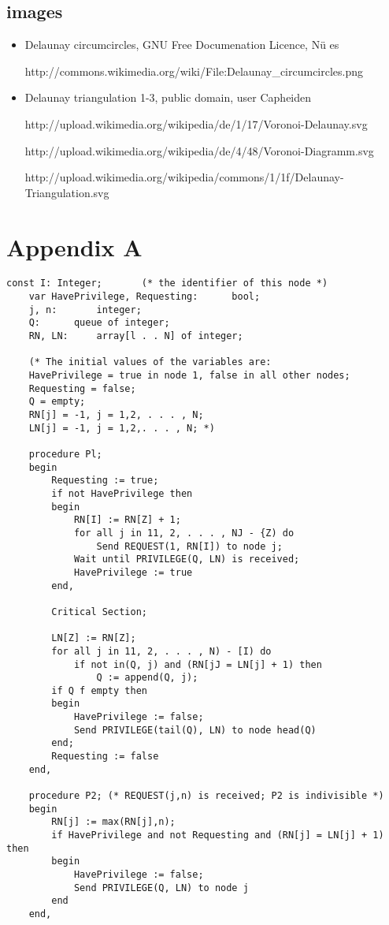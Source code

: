 \documentclass[a4paper,12pt]{article}
\begin{document}
\subsection{images}
\begin{itemize}
\item
Delaunay circumcircles, GNU Free Documenation Licence, N\"u es

http://commons.wikimedia.org/wiki/File:Delaunay\_circumcircles.png

\item
Delaunay triangulation 1-3, public domain, user Capheiden 

http://upload.wikimedia.org/wikipedia/de/1/17/Voronoi-Delaunay.svg

http://upload.wikimedia.org/wikipedia/de/4/48/Voronoi-Diagramm.svg

http://upload.wikimedia.org/wikipedia/commons/1/1f/Delaunay-Triangulation.svg
\end{itemize}

\newpage
\section{Appendix A}
\begin{lstlisting}[label=some-code,caption=Suzuki and Kazami's algorithm]
const I: Integer;		(* the identifier of this node *)
	var HavePrivilege, Requesting:		bool;
	j, n:	 	integer;
	Q: 		queue of integer;
	RN, LN: 	array[l . . N] of integer;

	(* The initial values of the variables are:
	HavePrivilege = true in node 1, false in all other nodes;
	Requesting = false;
	Q = empty;
	RN[j] = -1, j = 1,2, . . . , N;
	LN[j] = -1, j = 1,2,. . . , N; *)

	procedure Pl;
	begin
		Requesting := true;
		if not HavePrivilege then
		begin
			RN[I] := RN[Z] + 1;
			for all j in 11, 2, . . . , NJ - {Z) do
				Send REQUEST(1, RN[I]) to node j;
			Wait until PRIVILEGE(Q, LN) is received;
			HavePrivilege := true
		end,
	
		Critical Section;

		LN[Z] := RN[Z];
		for all j in 11, 2, . . . , N) - [I) do
			if not in(Q, j) and (RN[jJ = LN[j] + 1) then
				Q := append(Q, j);
		if Q f empty then
		begin
			HavePrivilege := false;
			Send PRIVILEGE(tail(Q), LN) to node head(Q)
		end;
		Requesting := false
	end,

	procedure P2; (* REQUEST(j,n) is received; P2 is indivisible *)
	begin
		RN[j] := max(RN[j],n);
		if HavePrivilege and not Requesting and (RN[j] = LN[j] + 1) then
		begin
			HavePrivilege := false;
			Send PRIVILEGE(Q, LN) to node j
		end
	end,

\end{lstlisting}
\end{document}
